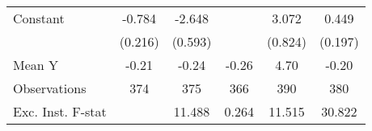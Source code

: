 {\begin{tabular}{l*{5}{c}}
\addlinespace
Constant            &      -0.784\sym{***}&      -2.648\sym{***}&                     &       3.072\sym{***}&       0.449\sym{**} \\
                    &     (0.216)         &     (0.593)         &                     &     (0.824)         &     (0.197)         \\
\midrule
Mean Y              &       -0.21         &       -0.24         &       -0.26         &        4.70         &       -0.20         \\
Observations        &         374         &         375         &         366         &         390         &         380         \\
Exc. Inst. F-stat   &                     &      11.488         &       0.264         &      11.515         &      30.822         \\
\bottomrule
\end{tabular}
}

